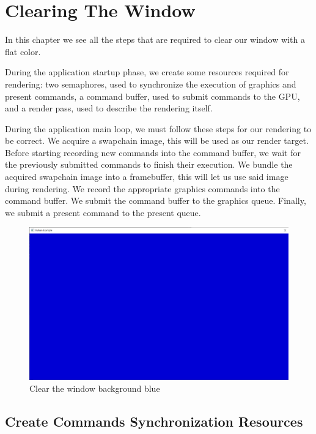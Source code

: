\chapter{Clearing The Window}
\label{chap:ClearWindow}

In this chapter we see all the steps that are required to clear our
window with a flat color.

During the application startup phase, we create some resources
required for rendering: two semaphores, used to synchronize the
execution of graphics and present commands, a command buffer,
used to submit commands to the GPU, and a render pass, used
to describe the rendering itself.

During the application main loop, we must follow these steps for our
rendering to be correct.
We acquire a swapchain image, this will be used as our render target.
Before starting recording new commands into the command buffer, we wait
for the previously submitted commands to finish their execution.
We bundle the acquired swapchain image into a framebuffer,
this will let us use said image during rendering.
We record the appropriate graphics commands into the command buffer.
We submit the command buffer to the graphics queue.
Finally, we submit a present command to the present queue.

\begin{figure}[ht]
    \centering
    \includegraphics[scale=0.20]{images/ChClearWindow/ClearWindow.png}
    \caption{Clear the window background blue}
    \label{fig::ClearWindow}
\end{figure}

\section{Create Commands Synchronization Resources}

